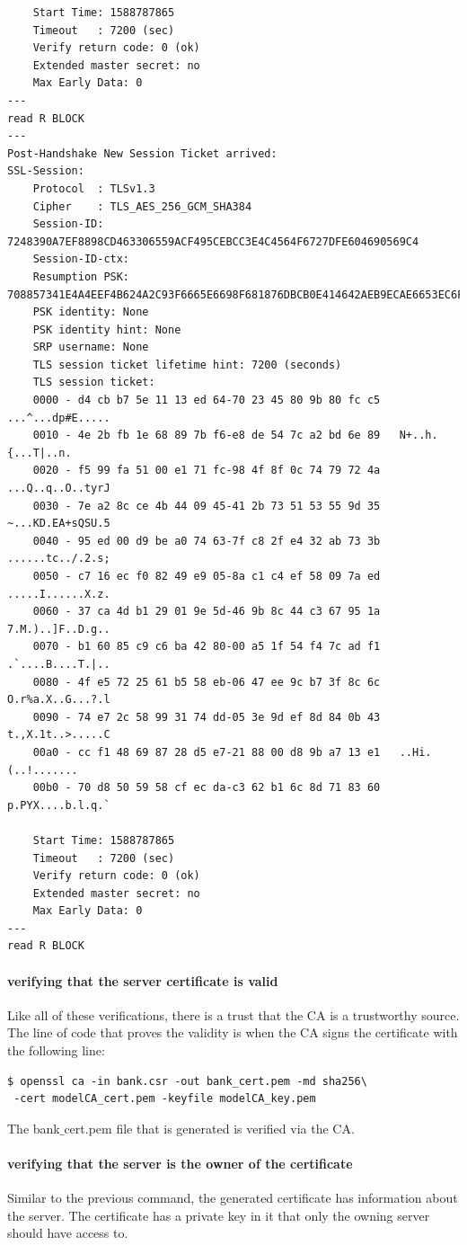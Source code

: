 \documentclass[12pt]{article}
\begin{document}
\begin{lstlisting}
    Start Time: 1588787865
    Timeout   : 7200 (sec)
    Verify return code: 0 (ok)
    Extended master secret: no
    Max Early Data: 0
---
read R BLOCK
---
Post-Handshake New Session Ticket arrived:
SSL-Session:
    Protocol  : TLSv1.3
    Cipher    : TLS_AES_256_GCM_SHA384
    Session-ID: 7248390A7EF8898CD463306559ACF495CEBCC3E4C4564F6727DFE604690569C4
    Session-ID-ctx: 
    Resumption PSK: 708857341E4A4EEF4B624A2C93F6665E6698F681876DBCB0E414642AEB9ECAE6653EC6F9F72238AF20F52ECC997A598D
    PSK identity: None
    PSK identity hint: None
    SRP username: None
    TLS session ticket lifetime hint: 7200 (seconds)
    TLS session ticket:
    0000 - d4 cb b7 5e 11 13 ed 64-70 23 45 80 9b 80 fc c5   ...^...dp#E.....
    0010 - 4e 2b fb 1e 68 89 7b f6-e8 de 54 7c a2 bd 6e 89   N+..h.{...T|..n.
    0020 - f5 99 fa 51 00 e1 71 fc-98 4f 8f 0c 74 79 72 4a   ...Q..q..O..tyrJ
    0030 - 7e a2 8c ce 4b 44 09 45-41 2b 73 51 53 55 9d 35   ~...KD.EA+sQSU.5
    0040 - 95 ed 00 d9 be a0 74 63-7f c8 2f e4 32 ab 73 3b   ......tc../.2.s;
    0050 - c7 16 ec f0 82 49 e9 05-8a c1 c4 ef 58 09 7a ed   .....I......X.z.
    0060 - 37 ca 4d b1 29 01 9e 5d-46 9b 8c 44 c3 67 95 1a   7.M.)..]F..D.g..
    0070 - b1 60 85 c9 c6 ba 42 80-00 a5 1f 54 f4 7c ad f1   .`....B....T.|..
    0080 - 4f e5 72 25 61 b5 58 eb-06 47 ee 9c b7 3f 8c 6c   O.r%a.X..G...?.l
    0090 - 74 e7 2c 58 99 31 74 dd-05 3e 9d ef 8d 84 0b 43   t.,X.1t..>.....C
    00a0 - cc f1 48 69 87 28 d5 e7-21 88 00 d8 9b a7 13 e1   ..Hi.(..!.......
    00b0 - 70 d8 50 59 58 cf ec da-c3 62 b1 6c 8d 71 83 60   p.PYX....b.l.q.`

    Start Time: 1588787865
    Timeout   : 7200 (sec)
    Verify return code: 0 (ok)
    Extended master secret: no
    Max Early Data: 0
---
read R BLOCK
    \end{lstlisting}
\paragraph{verifying that the server certificate is valid}
Like all of these verifications, there is a trust that the CA is a trustworthy source. The line of code that proves the validity is when the CA signs the certificate with the following line:
\begin{verbatim}
$ openssl ca -in bank.csr -out bank_cert.pem -md sha256\
 -cert modelCA_cert.pem -keyfile modelCA_key.pem
\end{verbatim}
The bank$\_$cert.pem file that is generated is verified via the CA.

\paragraph{verifying that the server is the owner of the certificate}
Similar to the previous command, the generated certificate has information about the server. The certificate has a private key in it that only the owning server should have access to.
\end{document}
